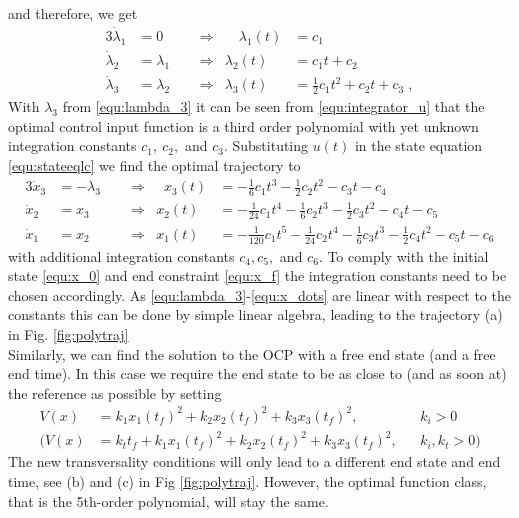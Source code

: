and therefore, we get
\begin{alignat}{3}
\nonumber
	\dot \lambda_1 &= 0 \quad  & &\Rightarrow &\quad \lambda_1(t) &= c_1 \\
\nonumber
	\dot \lambda_2 &= \lambda_1 & &\Rightarrow  & \lambda_2(t) &= c_1 t + c_2 \\
\label{equ:lambda_3}
	\dot \lambda_3 &= \lambda_2 & &\Rightarrow  & \lambda_3(t) &= \frac{1}{2}c_1 t^2 + c_2 t + c_3 \; , 
\end{alignat}
With $\lambda_3$ from \eqref{equ:lambda_3} it can be seen from \eqref{equ:integrator_u} that the optimal control input function is a third order polynomial with yet unknown integration constants $c_1, \ c_2,$ and $c_3$. Substituting $u(t)$ in the state equation \eqref{equ:stateeqlc} we find the optimal trajectory to 
\begin{alignat}{3}
	\dot x_3 &= -\lambda_3 \;\;  & &\Rightarrow &\;\; x_3(t) &= -\frac{1}{6}c_1 t^3 - \frac{1}{2}c_2 t^2 - c_3 t - c_4 \\
	\dot x_2 &= x_3 & &\Rightarrow  & x_2(t) &= -\frac{1}{24} c_1 t^4 - \frac{1}{6}c_2 t^3 - \frac{1}{2} c_3 t^2 - c_4 t - c_5 \\
	\dot x_1 &= x_2 & &\Rightarrow  & x_1(t) &= -\frac{1}{120} c_1 t^5 - \frac{1}{24} c_2 t^4 - \frac{1}{6}c_3 t^3 -\frac{1}{2}c_4 t^2 - c_5 t - c_6
	\label{equ:x_dots}
\end{alignat}
with additional integration constants $c_4,c_5,$ and $c_6$. To comply with the initial state \eqref{equ:x_0} and end constraint \eqref{equ:x_f} the integration constants need to be chosen accordingly. As \eqref{equ:lambda_3}-\eqref{equ:x_dots} are linear with respect to the constants this can be done by simple linear algebra, leading to the trajectory (a) in Fig. \ref{fig:polytraj} 
\\
Similarly, we can find the solution to the OCP with a free end state (and a free end time). In this case we require the end state to be as close to (and as soon at) the reference as possible by setting
\begin{align*}
V(x) &=k_1 x_1 (t_f)^2+k_2 x_2(t_f)^2 + k_3 x_3(t_f)^2 ,&& k_i>0\\
(V(x) &=k_t t_f+k_1 x_1 (t_f)^2+k_2 x_2(t_f)^2 + k_3 x_3(t_f)^2 ,&& k_i,k_t>0 )
\end{align*}
The new transversality conditions will only lead to a different end state and end time, see (b) and (c) in Fig \ref{fig:polytraj}. However, the optimal function class, that is the 5th-order polynomial, will stay the same.

